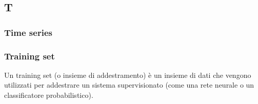 \subsection*{\textbf{\hfill \Huge{T} \hfill}} 
\subsubsection*{Time series}

\subsubsection*{Training set}
Un training set (o insieme di addestramento) è un insieme di dati che vengono utilizzati per addestrare un sistema supervisionato (come una rete neurale o un classificatore probabilistico).
